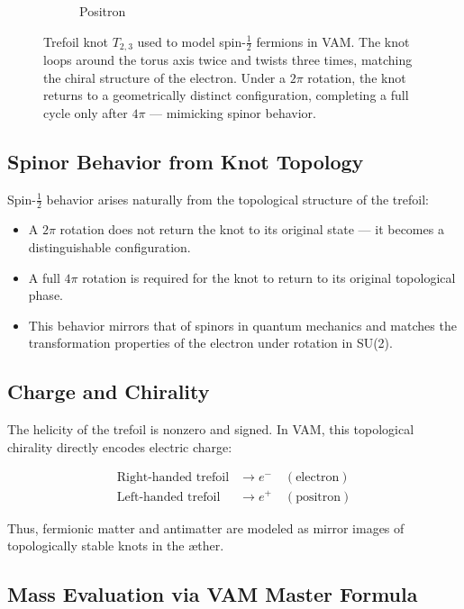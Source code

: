 \begin{figure}[H]
\begin{subfigure}[b]{0.3\textwidth}
        \caption{Positron}
    \end{subfigure}
    \caption{Trefoil knot \( T_{2,3} \) used to model spin-\(\tfrac{1}{2}\) fermions in VAM. The knot loops around the torus axis twice and twists three times, matching the chiral structure of the electron. Under a \(2\pi\) rotation, the knot returns to a geometrically distinct configuration, completing a full cycle only after \(4\pi\) — mimicking spinor behavior.}
\end{figure}

\subsection{Spinor Behavior from Knot Topology}

Spin-\(\tfrac{1}{2}\) behavior arises naturally from the topological structure of the trefoil:

\begin{itemize}
    \item A \(2\pi\) rotation does not return the knot to its original state — it becomes a distinguishable configuration.
    \item A full \(4\pi\) rotation is required for the knot to return to its original topological phase.
    \item This behavior mirrors that of spinors in quantum mechanics and matches the transformation properties of the electron under rotation in SU(2).
\end{itemize}

\subsection{Charge and Chirality}

The helicity of the trefoil is nonzero and signed. In VAM, this topological chirality directly encodes electric charge:

\begin{align*}
\text{Right-handed trefoil} &\rightarrow e^- \quad (\text{electron}) \\
\text{Left-handed trefoil} &\rightarrow e^+ \quad (\text{positron})
\end{align*}

Thus, fermionic matter and antimatter are modeled as mirror images of topologically stable knots in the æther.

\subsection{Mass Evaluation via VAM Master Formula}

